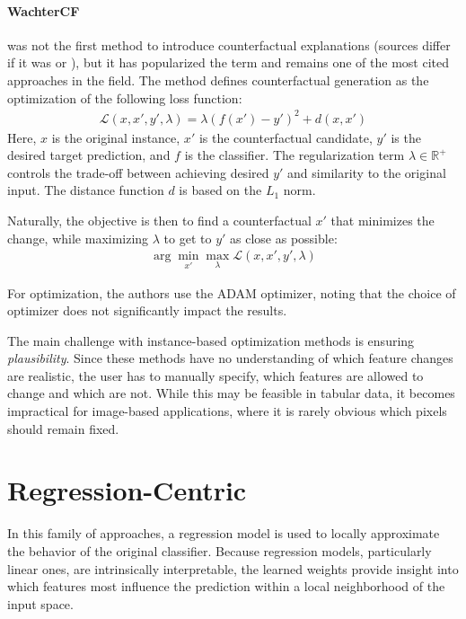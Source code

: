 \begin{methodparagraph}
    \paragraph{WachterCF} \cite{wachter2017counterfactual} was not the first method to introduce counterfactual explanations
    (sources differ if it was \cite{martens2014explaining} or \cite{cui2015optimal}),
    but it has popularized the term and remains one of the most cited approaches in the field.
    The method defines counterfactual generation as the optimization of the following loss function:
    \begin{align*}
        \mathcal{L}(x, x', y', \lambda) = \lambda (f(x') - y')^2 + d(x, x')
    \end{align*}
    Here, $x$ is the original instance,
    $x'$ is the counterfactual candidate,
    $y'$ is the desired target prediction,
    and $f$ is the classifier.
    The regularization term $\lambda \in \mathbb{R}^+$ controls the trade-off between
    achieving desired $y'$ and similarity to the original input.
    The distance function $d$ is based on the $L_1$ norm.

    Naturally, the objective is then to find a counterfactual $x'$ that minimizes the change,
    while maximizing $\lambda$ to get to $y'$ as close as possible:
    \begin{align*}
        \arg \min_{x'} \max_{\lambda} \mathcal{L}(x, x', y', \lambda)
    \end{align*}

    For optimization, the authors use the ADAM optimizer,
    noting that the choice of optimizer does not significantly impact the results.
\end{methodparagraph}

The main challenge with instance-based optimization methods is ensuring \emph{plausibility}.
Since these methods have no understanding of which feature changes are realistic,
the user has to manually specify, which features are allowed to change and which are not.
While this may be feasible in tabular data, it becomes impractical for image-based applications,
where it is rarely obvious which pixels should remain fixed.


\section{Regression-Centric}

In this family of approaches, a regression model is used to locally approximate the behavior of the original classifier.
Because regression models, particularly linear ones, are intrinsically interpretable, the learned weights provide insight
into which features most influence the prediction within a local neighborhood of the input space.

